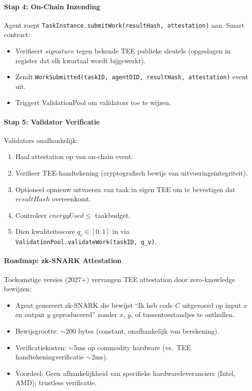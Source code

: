 \documentclass[11pt]{article}
\begin{document}
\paragraph{Stap 4: On-Chain Inzending}
Agent roept \texttt{TaskInstance.submitWork(resultHash, attestation)} aan. Smart contract:
\begin{itemize}[noitemsep]
  \item Verifieert $signature$ tegen bekende TEE publieke sleutels (opgeslagen in register dat elk kwartaal wordt bijgewerkt).
  \item Zendt \texttt{WorkSubmitted(taskID, agentDID, resultHash, attestation)} event uit.
  \item Triggert ValidationPool om validators toe te wijzen.
\end{itemize}

\paragraph{Stap 5: Validator Verificatie}
Validators onafhankelijk:
\begin{enumerate}[noitemsep]
  \item Haal attestation op van on-chain event.
  \item Verifieer TEE-handtekening (cryptografisch bewijs van uitvoeringsintegriteit).
  \item Optioneel opnieuw uitvoeren van taak in eigen TEE om te bevestigen dat $resultHash$ overeenkomt.
  \item Controleer $energyUsed \leq$ taakbudget.
  \item Dien kwaliteitsscore $q_v \in [0,1]$ in via \texttt{ValidationPool.validateWork(taskID, q\_v)}.
\end{enumerate}

\paragraph{Roadmap: zk-SNARK Attestation}
Toekomstige versies (2027+) vervangen TEE attestation door zero-knowledge bewijzen:
\begin{itemize}[noitemsep]
  \item Agent genereert zk-SNARK die bewijst ``Ik heb code $C$ uitgevoerd op input $x$ en output $y$ geproduceerd'' zonder $x$, $y$, of tussentoestandjes te onthullen.
  \item Bewijsgrootte: $\sim$200 bytes (constant, onafhankelijk van berekening).
  \item Verificatiekosten: $\sim$5ms op commodity hardware (vs.\ TEE handtekeningverificatie $\sim$2ms).
  \item Voordeel: Geen afhankelijkheid van specifieke hardwareleveranciers (Intel, AMD); trustless verificatie.
\end{itemize}
\end{document}
